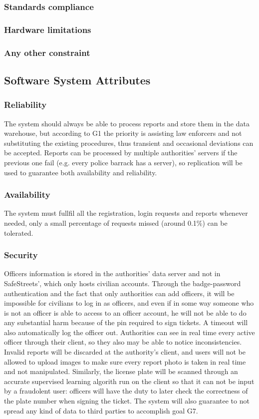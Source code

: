 \documentclass[12pt,a4paper]{article}
\begin{document}
\subsubsection{Standards	compliance}
\subsubsection{Hardware	limitations}
\subsubsection{Any	other	constraint} 
\subsection{Software	System	Attributes} 
\subsubsection{Reliability}
The system should always be able to process reports and store them in the data warehouse, but according to G1 the priority is assisting law enforcers and not substituting the existing procedures, thus transient and occasional deviations can be accepted.  Reports can be processed by multiple authorities' servers if the previous one fail (e.g. every police barrack has a server), so replication will be used to guarantee both availability and reliability.
\subsubsection{Availability}
The system must fullfil all the registration, login requests and reports whenever needed, only a small percentage of requests missed (around 0.1\%) can be tolerated. 
\subsubsection{Security}
Officers information is stored in the authorities' data server and not in SafeStreets', which only hosts civilian accounts. Through the badge-password authentication and the fact that only authorities can add officers, it will be impossible for civilians to log in as officers, and even if in some way someone who is not an officer is able to access to an officer account, he will not be able to do any substantial harm because of the pin required to sign tickets. A timeout will also automatically log the officer out. Authorities can see in real time every active officer through their client, so they also may be able to notice inconsistencies. Invalid reports will be discarded at the authority's client, and users will not be allowed to upload images to make sure every report photo is taken in real time and not manipulated. Similarly, the license plate will be scanned through an accurate supervised learning algorith run on the client so that it can not be input by a fraudolent user: officers will have the duty to later check the correctness of the plate number when signing the ticket.
The system will also guarantee to not spread any kind of data to third parties to accomplish goal G7.
\end{document}
